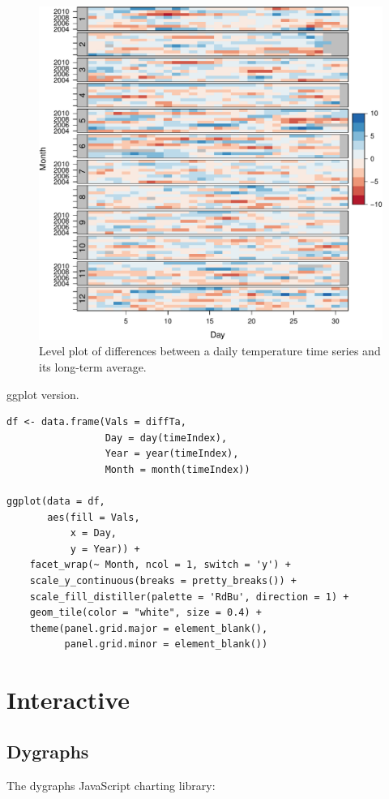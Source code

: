 \documentclass[smallroyalvopaper]{memoir}
\begin{document}
\begin{figure}[htbp]
\centering
\includegraphics[width=.9\linewidth]{figs/diffTa_levelplot.pdf}
\caption{Level plot of differences between a daily temperature time series and its long-term average. \label{fig:diffTa_level}}
\end{figure}

ggplot version.
\lstset{language=r,label= ,caption= ,captionpos=b,numbers=none}
\begin{lstlisting}
df <- data.frame(Vals = diffTa,
                 Day = day(timeIndex),
                 Year = year(timeIndex),
                 Month = month(timeIndex))

ggplot(data = df,
       aes(fill = Vals,
           x = Day,
           y = Year)) +
    facet_wrap(~ Month, ncol = 1, switch = 'y') +
    scale_y_continuous(breaks = pretty_breaks()) + 
    scale_fill_distiller(palette = 'RdBu', direction = 1) + 
    geom_tile(color = "white", size = 0.4) +
    theme(panel.grid.major = element_blank(),
          panel.grid.minor = element_blank())
\end{lstlisting}


\section{Interactive}
\label{sec:orgc05d485}

\subsection{Dygraphs \label{sec:dygraphs}}
\label{sec:orga94cdc9}
The dygraphs JavaScript charting library:
\end{document}
